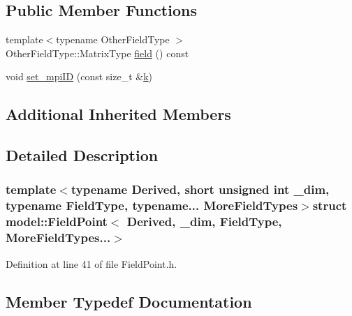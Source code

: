 \subsection*{Public Member Functions}
\begin{DoxyCompactItemize}
\item 
{\footnotesize template$<$typename Other\+Field\+Type $>$ }\\Other\+Field\+Type\+::\+Matrix\+Type \hyperlink{structmodel_1_1_field_point_3_01_derived_00_01__dim_00_01_field_type_00_01_more_field_types_8_8_8_4_a992db978cf1a09dacd25b09b879d2d30}{field} () const 
\item 
void \hyperlink{structmodel_1_1_field_point_3_01_derived_00_01__dim_00_01_field_type_00_01_more_field_types_8_8_8_4_a57e6248fbd8e5a06d5e84899b7c0f20b}{set\+\_\+mpi\+I\+D} (const size\+\_\+t \&\hyperlink{_f_e_m_2linear__elasticity__3d_2tetgen_2generate_p_o_l_ycube_8m_a5d2aad4440da75aa43f2643e72b1a3bd}{k})
\end{DoxyCompactItemize}
\subsection*{Additional Inherited Members}


\subsection{Detailed Description}
\subsubsection*{template$<$typename Derived, short unsigned int \+\_\+dim, typename Field\+Type, typename... More\+Field\+Types$>$struct model\+::\+Field\+Point$<$ Derived, \+\_\+dim, Field\+Type, More\+Field\+Types...$>$}



Definition at line 41 of file Field\+Point.\+h.



\subsection{Member Typedef Documentation}
\hypertarget{structmodel_1_1_field_point_3_01_derived_00_01__dim_00_01_field_type_00_01_more_field_types_8_8_8_4_a102f7ec843b150f0f63e8bea197a193a}{}

